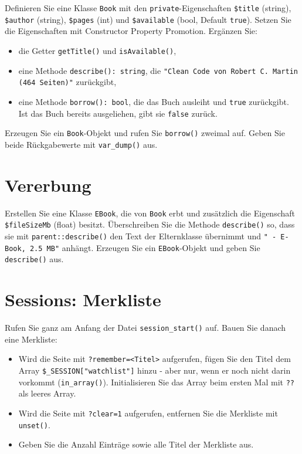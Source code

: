 \documentclass[a4paper,12pt]{article}
\begin{document}
Definieren Sie eine Klasse \texttt{Book} mit den \texttt{private}-Eigenschaften \texttt{\$title} (string), \texttt{\$author} (string), \texttt{\$pages} (int) und \texttt{\$available} (bool, Default \texttt{true}). Setzen Sie die Eigenschaften mit Constructor Property Promotion. Ergänzen Sie:

\begin{itemize}
    \item die Getter \texttt{getTitle()} und \texttt{isAvailable()},
    \item eine Methode \texttt{describe(): string}, die \texttt{"{}Clean Code von Robert C. Martin (464 Seiten)"{}} zurückgibt,
    \item eine Methode \texttt{borrow(): bool}, die das Buch ausleiht und \texttt{true} zurückgibt. Ist das Buch bereits ausgeliehen, gibt sie \texttt{false} zurück.
\end{itemize}

Erzeugen Sie ein \texttt{Book}-Objekt und rufen Sie \texttt{borrow()} zweimal auf. Geben Sie beide Rückgabewerte mit \texttt{var\_dump()} aus.

\section{Vererbung}

Erstellen Sie eine Klasse \texttt{EBook}, die von \texttt{Book} erbt und zusätzlich die Eigenschaft \texttt{\$fileSizeMb} (float) besitzt. Überschreiben Sie die Methode \texttt{describe()} so, dass sie mit \texttt{parent::describe()} den Text der Elternklasse übernimmt und \texttt{"{} - E-Book, 2.5 MB"{}} anhängt. Erzeugen Sie ein \texttt{EBook}-Objekt und geben Sie \texttt{describe()} aus.

\section{Sessions: Merkliste}

Rufen Sie ganz am Anfang der Datei \texttt{session\_start()} auf. Bauen Sie danach eine Merkliste:

\begin{itemize}
    \item Wird die Seite mit \texttt{?remember=<Titel>} aufgerufen, fügen Sie den Titel dem Array \texttt{\$\_SESSION["{}watchlist"{}]} hinzu - aber nur, wenn er noch nicht darin vorkommt (\texttt{in\_array()}). Initialisieren Sie das Array beim ersten Mal mit \texttt{??} als leeres Array.
    \item Wird die Seite mit \texttt{?clear=1} aufgerufen, entfernen Sie die Merkliste mit \texttt{unset()}.
    \item Geben Sie die Anzahl Einträge sowie alle Titel der Merkliste aus.
\end{itemize}
\end{document}
